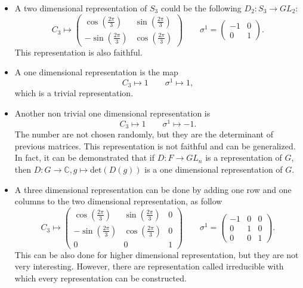 \documentclass[12pt]{book}
\theoremstyle{plain}
\newcommand{\C}{\mathbb{C}}
\theoremstyle{definition}
\theoremstyle{remark}
\begin{document}
\begin{itemize}
\item A two dimensional representation of $S_3$ could be the following $D_2:S_3 \to GL_2$:
\[C_3 \mapsto \begin{pmatrix}
  \cos\left(\frac{2\pi}{3}\right) & \sin\left(\frac{2\pi}{3}\right) \\
  -\sin\left(\frac{2\pi}{3}\right) & \cos\left(\frac{2\pi}{3}\right) 
 \end{pmatrix} \qquad \sigma^1 =  \begin{pmatrix}
 -1& 0 \\
0 & 1
 \end{pmatrix}.\]
This representation is also faithful.
\item A one dimensional representation is the map
\[C_3 \mapsto 1\qquad \sigma^1 \mapsto 1,\]
which is a trivial representation.
\item Another non trivial one dimensional representation is
\[C_3\mapsto 1 \qquad \sigma^1 \mapsto -1.\]
The number are not chosen randomly, but they are the determinant of previous matrices. This representation is not faithful and can be generalized. In fact, it can be demonstrated that if $D:F\to GL_n$ is a representation of $G$, then $D:G\to \C, g\mapsto \text{det}(D(g))$ is a one dimensional representation of $G$.
\item A three dimensional representation can be done by adding one row and one columns to the two dimensional representation, as follow
\[C_3 \mapsto \begin{pmatrix}
  \cos\left(\frac{2\pi}{3}\right) & \sin\left(\frac{2\pi}{3}\right) & 0\\
  -\sin\left(\frac{2\pi}{3}\right) & \cos\left(\frac{2\pi}{3}\right) & 0\\
  0 & 0 &1 
 \end{pmatrix} \qquad \sigma^1 =  \begin{pmatrix}
 -1& 0 & 0\\
0 & 1 & 0\\
0 &0 &1
 \end{pmatrix}.\]
This can be also done for higher dimensional representation, but they are not very interesting. However, there are representation called irreducible with which every representation can be constructed.
\end{itemize}
\end{document}
